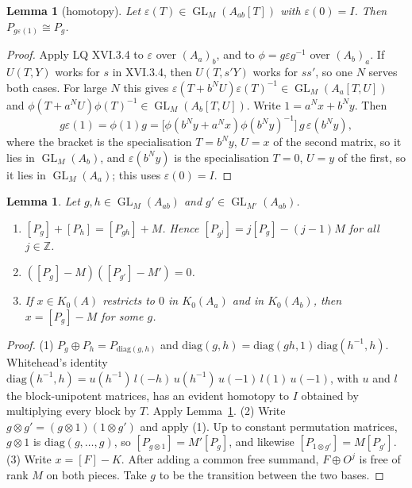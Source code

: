 \documentclass[11pt]{amsart}
\newtheorem{lemma}[theorem]{Lemma}
\theoremstyle{definition}
\theoremstyle{remark}
\newcommand{\GL}{\operatorname{GL}}
\begin{document}
\begin{lemma}[homotopy]\label{homotopy}
Let $\varepsilon(T)\in\GL_M(A_{ab}[T])$ with $\varepsilon(0)=I$. Then
$P_{g\varepsilon(1)}\cong P_g$.
\end{lemma}
\begin{proof}
Apply LQ XVI.3.4 to $\varepsilon$ over $(A_a)_b$, and to
$\phi=g\varepsilon g^{-1}$ over $(A_b)_a$. If $U(T,Y)$ works for $s$ in
XVI.3.4, then $U(T,s'Y)$ works for $ss'$, so one $N$ serves both cases. For
large $N$ this gives
$\varepsilon(T+b^NU)\varepsilon(T)^{-1}\in\GL_M(A_a[T,U])$ and
$\phi(T+a^NU)\phi(T)^{-1}\in\GL_M(A_b[T,U])$. Write
$1=a^Nx+b^Ny$. Then
\[ g\varepsilon(1)=\phi(1)g
 =\bigl[\phi(b^Ny+a^Nx)\phi(b^Ny)^{-1}\bigr]\,g\,\varepsilon(b^Ny),\]
where the bracket is the specialisation $T=b^Ny$, $U=x$ of the second
matrix, so it lies in $\GL_M(A_b)$, and $\varepsilon(b^Ny)$ is the
specialisation $T=0$, $U=y$ of the first, so it lies in $\GL_M(A_a)$; this
uses $\varepsilon(0)=I$.
\end{proof}

\begin{lemma}\label{split}
Let $g,h\in\GL_M(A_{ab})$ and $g'\in\GL_{M'}(A_{ab})$.
\begin{enumerate}
\item $[P_g]+[P_h]=[P_{gh}]+M$. Hence $[P_{g^{j}}]=j[P_g]-(j-1)M$ for all
  $j\in\mathbb Z$.
\item $([P_g]-M)([P_{g'}]-M')=0$.
\item If $x\in K_0(A)$ restricts to $0$ in $K_0(A_a)$ and in $K_0(A_b)$, then
  $x=[P_g]-M$ for some $g$.
\end{enumerate}
\end{lemma}
\begin{proof}
(1) $P_g\oplus P_h=P_{\mathrm{diag}(g,h)}$ and $\mathrm{diag}(g,h)=
\mathrm{diag}(gh,1)\,\mathrm{diag}(h^{-1},h)$. Whitehead's identity
$\mathrm{diag}(h^{-1},h)=u(h^{-1})\,l(-h)\,u(h^{-1})\,u(-1)\,l(1)\,u(-1)$,
with $u$ and $l$ the block-unipotent matrices, has an evident homotopy to $I$
obtained by multiplying every block by $T$. Apply Lemma~\ref{homotopy}.
(2) Write $g\otimes g'=(g\otimes1)(1\otimes g')$ and apply (1). Up to
constant permutation matrices, $g\otimes1$ is $\mathrm{diag}(g,\dots,g)$, so
$[P_{g\otimes1}]=M'[P_g]$, and likewise $[P_{1\otimes g'}]=M[P_{g'}]$.
(3) Write $x=[F]-K$. After adding a common free summand, $F\oplus O^j$ is
free of rank $M$ on both pieces. Take $g$ to be the transition between the
two bases.
\end{proof}
\end{document}
